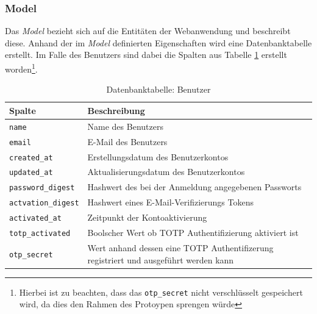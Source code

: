 \documentclass[11pt,a4paper,ngerman]{scrreprt}
\begin{document}
\subsubsection{Model}
Das \textit{Model} bezieht sich auf die Entitäten der Webanwendung und beschreibt diese. Anhand der im \textit{Model} definierten Eigenschaften wird eine Datenbanktabelle erstellt. Im Falle des Benutzers sind dabei die Spalten aus Tabelle \ref{table:db-user} erstellt worden\footnote{Hierbei ist zu beachten, dass das \texttt{otp\_secret} nicht verschlüsselt gespeichert wird, da dies den Rahmen des Protoypen sprengen würde}.
\begin{table}[htbp]
    \begin{tabularx}{\textwidth}{ lX }
        \toprule
        Spalte & Beschreibung \\ 
        \midrule
        \texttt{name} & Name des Benutzers \\
        \texttt{email} & E-Mail des Benutzers \\
        \texttt{created\_at} & Erstellungsdatum des Benutzerkontos \\
        \texttt{updated\_at} & Aktualisierungsdatum des Benutzerkontos \\
        \texttt{password\_digest} & Hashwert des bei der Anmeldung angegebenen Passworts \\
        \texttt{actvation\_digest} & Hashwert eines E-Mail-Verifizierungs Tokens \\
        \texttt{activated\_at} & Zeitpunkt der Kontoaktivierung \\
        \texttt{totp\_activated} & Boolscher Wert ob TOTP Authentifizierung aktiviert ist \\
        \texttt{otp\_secret} & Wert anhand dessen eine TOTP Authentifizerung registriert und ausgeführt werden kann \\
        \bottomrule
    \end{tabularx}
    \caption{Datenbanktabelle: Benutzer}
    \label{table:db-user}
\end{table}
\end{document}
